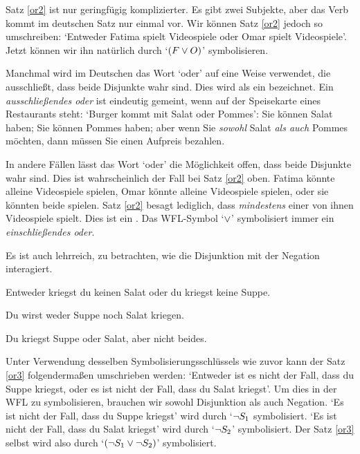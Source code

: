

Satz \ref{or2} ist nur geringfügig komplizierter. Es gibt zwei Subjekte, aber das Verb kommt im deutschen Satz nur einmal vor. Wir können Satz \ref{or2} jedoch so umschreiben: `Entweder Fatima spielt Videospiele  oder Omar spielt Videospiele'. Jetzt können wir ihn natürlich durch `$(F \vee O)$' symbolisieren.

Manchmal wird im Deutschen das Wort `oder' auf eine Weise verwendet, die ausschlie{\ss}t, dass beide Disjunkte wahr sind. Dies wird als ein  bezeichnet. Ein \emph{ausschlie{\ss}endes oder} ist eindeutig gemeint, wenn auf der Speisekarte eines Restaurants steht: `Burger kommt mit Salat oder Pommes': Sie können Salat haben; Sie können Pommes haben; aber wenn Sie \emph{sowohl} Salat \emph{als auch} Pommes möchten, dann müssen Sie einen Aufpreis bezahlen.

In andere Fällen lässt das Wort `oder' die Möglichkeit offen, dass beide Disjunkte wahr sind. Dies ist wahrscheinlich der Fall bei Satz \ref{or2} oben. Fatima könnte alleine Videospiele spielen, Omar könnte alleine Videospiele spielen, oder sie könnten beide spielen. Satz \ref{or2} besagt lediglich, dass \emph{mindestens} einer von ihnen Videospiele spielt. Dies ist ein . Das WFL-Symbol `$\vee$' symbolisiert immer ein \emph{einschlie{\ss}endes oder}.

Es ist auch lehrreich, zu betrachten, wie die Disjunktion mit der Negation interagiert.
	\begin{earg}
		\item[\ex{or3}] Entweder kriegst du keinen Salat oder du kriegst keine Suppe.
		\item[\ex{or4}] Du wirst weder Suppe noch Salat kriegen.
		\item[\ex{or.xor}] Du kriegst Suppe oder Salat, aber nicht beides.
	\end{earg}
Unter Verwendung desselben Symbolisierungsschlüssels wie zuvor kann der Satz \ref{or3} folgenderma{\ss}en umschrieben werden: `Entweder ist es nicht der Fall, dass du Suppe kriegst, oder es ist nicht der Fall, dass du Salat kriegst'. Um dies in der WFL zu symbolisieren, brauchen wir sowohl Disjunktion als auch Negation. `Es ist nicht der Fall, dass du Suppe kriegst' wird durch `$\neg S_1$ symbolisiert. `Es ist nicht der Fall, dass du Salat kriegst' wird durch `$\neg S_2$' symbolisiert. Der Satz \ref{or3} selbst wird also durch `$(\neg S_1 \vee \neg S_2)$' symbolisiert.


